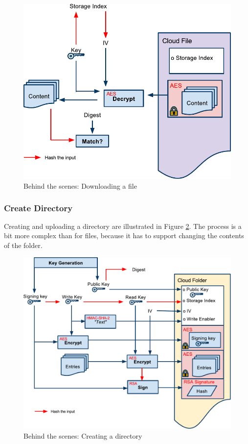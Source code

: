 \documentclass[pdftex,english,10pt,b5paper,twoside]{book}
\begin{document}
\begin{figure}[h!]
    \centering
    \includegraphics[width=\columnwidth]{CryptoOpenFile.pdf}
    \caption{Behind the scenes: Downloading a file}
    \label{fig:CS:OF}
\end{figure}

\subsubsection{Create Directory}

Creating and uploading a directory are illustrated in Figure \ref{fig:CS:CD}.
The process is a bit more complex than for files, because it has to support
changing the contents of the folder.

\begin{figure}[h!]
    \centering
        \includegraphics[width=\columnwidth]{CryptoCreateFolder.pdf}
	    \caption{Behind the scenes: Creating a directory}
    \label{fig:CS:CD}
\end{figure}
\end{document}
